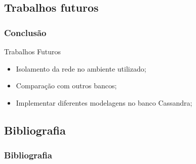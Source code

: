\documentclass[brazil]{beamer}
\begin{document}
\subsection{Trabalhos futuros}
\begin{frame}
\frametitle{Conclusão}
	\begin{block}{Trabalhos Futuros}
		\begin{itemize}
			\item Isolamento da rede no ambiente utilizado;
			\item Comparação com outros bancos;
			\item Implementar diferentes modelagens no banco Cassandra;
		\end{itemize}
\end{block}
\end{frame}

\subsection{Bibliografia}
\begin{frame}
\frametitle{Bibliografia}\footnotesize
  \nocite{seijiconectados, cjdate, pramod, cassandraguide}
  
  
\end{frame}


\end{document}

